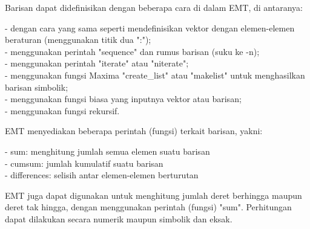 \documentclass{article}
\begin{document}
\begin{eulernotebook}
\begin{eulercomment}
\begin{eulercomment}
\begin{eulercomment}
\begin{eulercomment}
\begin{eulercomment}
Barisan dapat didefinisikan dengan beberapa cara di dalam EMT, di
antaranya:

- dengan cara yang sama seperti mendefinisikan vektor dengan
elemen-elemen beraturan (menggunakan titik dua ":");\\
- menggunakan perintah "sequence" dan rumus barisan (suku ke -n);\\
- menggunakan perintah "iterate" atau "niterate";\\
- menggunakan fungsi Maxima "create\_list" atau "makelist" untuk
menghasilkan barisan simbolik;\\
- menggunakan fungsi biasa yang inputnya vektor atau barisan;\\
- menggunakan fungsi rekursif.

EMT menyediakan beberapa perintah (fungsi) terkait barisan, yakni:

- sum: menghitung jumlah semua elemen suatu barisan\\
- cumsum: jumlah kumulatif suatu barisan\\
- differences: selisih antar elemen-elemen berturutan

EMT juga dapat digunakan untuk menghitung jumlah deret berhingga
maupun deret tak hingga, dengan menggunakan perintah (fungsi) "sum".
Perhitungan dapat dilakukan secara numerik maupun simbolik dan eksak.


\end{eulercomment}
\end{eulercomment}
\end{eulercomment}
\end{eulercomment}
\end{eulercomment}
\end{eulernotebook}
\end{document}
